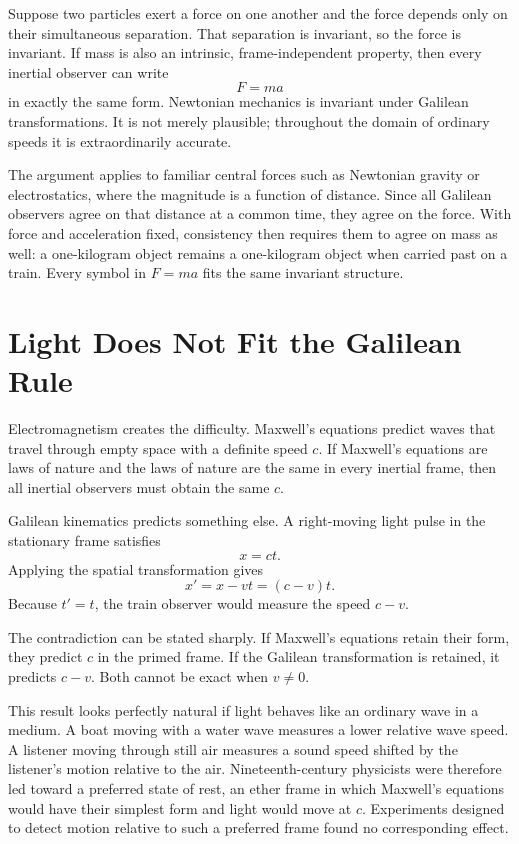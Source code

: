 Suppose two particles exert a force on one another and the force depends only on their simultaneous separation. That separation is invariant, so the force is invariant. If mass is also an intrinsic, frame-independent property, then every inertial observer can write
\begin{equation}
F=ma
\end{equation}
in exactly the same form. Newtonian mechanics is invariant under Galilean transformations. It is not merely plausible; throughout the domain of ordinary speeds it is extraordinarily accurate.

The argument applies to familiar central forces such as Newtonian gravity or electrostatics, where the magnitude is a function of distance. Since all Galilean observers agree on that distance at a common time, they agree on the force. With force and acceleration fixed, consistency then requires them to agree on mass as well: a one-kilogram object remains a one-kilogram object when carried past on a train. Every symbol in \(F=ma\) fits the same invariant structure.

\section{Light Does Not Fit the Galilean Rule}

Electromagnetism creates the difficulty. Maxwell's equations predict waves that travel through empty space with a definite speed \(c\). If Maxwell's equations are laws of nature and the laws of nature are the same in every inertial frame, then all inertial observers must obtain the same \(c\).

Galilean kinematics predicts something else. A right-moving light pulse in the stationary frame satisfies
\begin{equation}
x=ct.
\end{equation}
Applying the spatial transformation gives
\begin{equation}
x'=x-vt=(c-v)t.
\end{equation}
Because \(t'=t\), the train observer would measure the speed \(c-v\).

The contradiction can be stated sharply. If Maxwell's equations retain their form, they predict \(c\) in the primed frame. If the Galilean transformation is retained, it predicts \(c-v\). Both cannot be exact when \(v\ne0\).

This result looks perfectly natural if light behaves like an ordinary wave in a medium. A boat moving with a water wave measures a lower relative wave speed. A listener moving through still air measures a sound speed shifted by the listener's motion relative to the air. Nineteenth-century physicists were therefore led toward a preferred state of rest, an ether frame in which Maxwell's equations would have their simplest form and light would move at \(c\). Experiments designed to detect motion relative to such a preferred frame found no corresponding effect.

